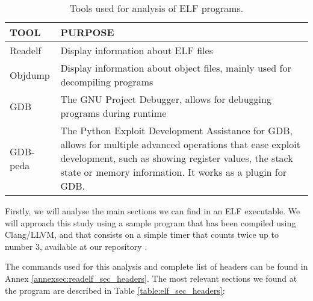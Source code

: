 \begin{table}[htbp]
\begin{tabular}{|>{\centering\arraybackslash}p{3cm}|>{\centering\arraybackslash}p{10cm}|}
\hline
\textbf{TOOL} & \textbf{PURPOSE}\\
\hline
\hline
Readelf & Display information about ELF files\\
\hline
Objdump & Display information about object files, mainly used for decompiling programs\\
\hline
GDB & The GNU Project Debugger, allows for debugging programs during runtime\\
\hline
GDB-peda & The Python Exploit Development Assistance for GDB, allows for multiple advanced operations that ease exploit development, such as showing register values, the stack state or memory information. It works as a plugin for GDB.\\
\hline
\end{tabular}
\caption{Tools used for analysis of ELF programs.}
\label{table:elf_tools}
\end{table}

Firstly, we will analyse the main sections we can find in an ELF executable. We will approach this study using a sample program that has been compiled using Clang/LLVM, and that consists on a simple timer that counts twice up to number 3, available at our repository \cite{repo_simple_timer}.

The commands used for this analysis and complete list of headers can be found in Annex \ref{annexsec:readelf_sec_headers}. The most relevant sections we found at the program are described in Table \ref{table:elf_sec_headers}:

